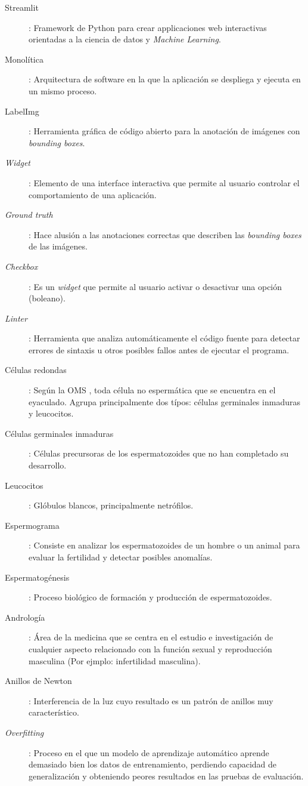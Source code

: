 \documentclass[12pt,a4paper,onecolumn,oneside]{report}
\begin{document}
\begin{description}
  \item[Streamlit]: Framework de Python para crear applicaciones web interactivas orientadas a la ciencia de datos y \textit{Machine Learning}.
  \item[Monolítica]: Arquitectura de software en la que la aplicación se despliega y ejecuta en un mismo proceso.     
  \item[LabelImg]: Herramienta gráfica de código abierto para la anotación de imágenes con \textit{bounding boxes}.
  \item[\textit{Widget}]: Elemento de una interface interactiva que permite al usuario controlar el comportamiento de una aplicación.
  \item[\textit{Ground truth}]: Hace alusión a las anotaciones correctas que describen las \textit{bounding boxes} de las imágenes.
  \item[\textit{Checkbox}]: Es un \textit{widget} que permite al usuario activar o desactivar una opción (boleano).  
  \item[\textit{Linter}]:  Herramienta que analiza automáticamente el código fuente para detectar errores de sintaxis u otros posibles fallos antes de ejecutar el programa. 
  \item[Células redondas]: Según la OMS \cite{OMS}, toda célula no espermática que se encuentra en el eyaculado. Agrupa principalmente dos típos: células germinales inmaduras y leucocitos.
  \item[Células germinales inmaduras]: Células precursoras de los espermatozoides que no han completado su desarrollo.
  \item[Leucocitos]: Glóbulos blancos, principalmente netrófilos.  
  \item[Espermograma]: Consiste en analizar los espermatozoides de un hombre o un animal para evaluar la fertilidad y detectar posibles anomalías. 
  \item[Espermatogénesis]: Proceso biológico de formación y producción de espermatozoides.
  \item[Andrología]: Área de la medicina que se centra en el estudio e investigación de cualquier aspecto relacionado con la función sexual y reproducción masculina (Por ejmplo: infertilidad masculina).  
  \item[Anillos de Newton]: Interferencia de la luz cuyo resultado es un patrón de anillos muy característico.
  \item[\textit{Overfitting}]: Proceso en el que un modelo de aprendizaje automático aprende demasiado bien los datos de entrenamiento, perdiendo capacidad de generalización y obteniendo peores resultados en las pruebas de evaluación.

\end{description}
\end{document}
